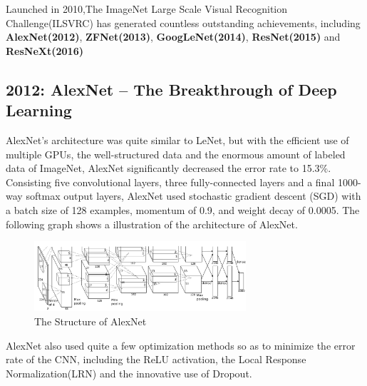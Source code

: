 \documentclass[a4paper]{article}
\begin{document}
Launched in 2010,The ImageNet Large Scale Visual Recognition Challenge(ILSVRC) has generated countless outstanding achievements, including \textbf{AlexNet(2012)}\citep{Krizhevsky2012ImageNetCW}, \textbf{ZFNet(2013)}\citep{DBLP:journals/corr/ZeilerF13}, \textbf{GoogLeNet(2014)}\citep{DBLP:journals/corr/SzegedyLJSRAEVR14}, \textbf{ResNet(2015)}\citep{DBLP:journals/corr/HeZRS15} and \textbf{ResNeXt(2016)}\citep{DBLP:journals/corr/XieGDTH16}


\subsection{2012: AlexNet – The Breakthrough of Deep Learning}

AlexNet's architecture was quite similar to LeNet, but with the efficient use of multiple GPUs, the well-structured data and the enormous amount of labeled data of ImageNet, AlexNet significantly decreased the error rate to 15.3\%. Consisting five convolutional layers, three fully-connected layers and a final 1000-way softmax output layers, AlexNet used stochastic gradient descent (SGD)\citep{DBLP:journals/corr/Ruder16} with a batch size of 128 examples, momentum of 0.9, and weight decay of 0.0005. The following graph shows a illustration of the architecture of AlexNet.

\begin{figure}[ht]
    \centering
    \includegraphics[width=0.7\textwidth,height=0.25\textwidth]{images/Alexnet.png}
    \caption{The Structure of AlexNet\citep{Krizhevsky2012ImageNetCW}}
\end{figure}

AlexNet also used quite a few optimization methods so as to minimize the error rate of the CNN, including the ReLU activation, the Local Response Normalization(LRN) and the innovative use of Dropout.
\end{document}
